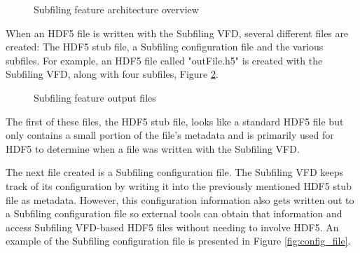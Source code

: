\documentclass[../main.tex]{subfiles}
\begin{document}
\begin{figure}
\centering
{}
\caption{Subfiling feature architecture overview}
\label{fig:architecture}
\end{figure}

When an HDF5 file is written with the Subfiling VFD, several different files are created: The HDF5
stub file, a Subfiling configuration file and the various subfiles. For example, an HDF5 file called
"outFile.h5" is created with the Subfiling VFD, along with four subfiles, Figure \ref{fig:outputs}.

\begin{figure}
\centering
{}
\caption{Subfiling feature output files}
\label{fig:outputs}
\end{figure}

The first of these files, the HDF5 stub file, looks like a standard HDF5 file but only contains a small
portion of the file's metadata and is primarily used for HDF5 to determine when a file was written with
the Subfiling VFD.

The next file created is a Subfiling configuration file. The Subfiling VFD keeps track of its configuration
by writing it into the previously mentioned HDF5 stub file as metadata. However, this configuration information
also gets written out to a Subfiling configuration file so external tools can obtain that information
and access Subfiling VFD-based HDF5 files without needing to involve HDF5. An example of the Subfiling
configuration file is presented in Figure \ref{fig:config_file}.
\end{document}
